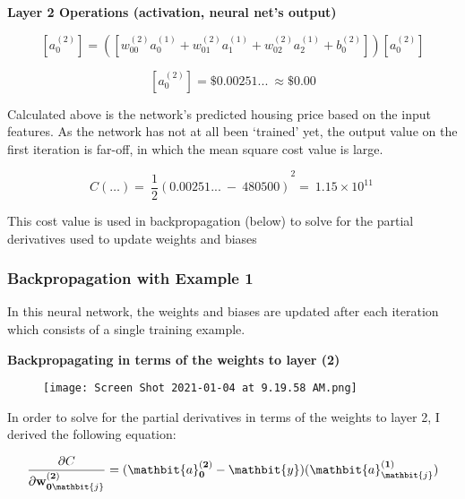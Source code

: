 \documentclass[12pt,a4paper]{article}
\begin{document}
\hspace{}

\textbf{Layer 2 Operations (activation, neural net’s output)}


\begin{equation}
\left[a_0^{\left(2\right)}\right]=\left(\left[w_{00}^{\left(2\right)}a_0^{\left(1\right)}+w_{01}^{\left(2\right)}a_1^{\left(1\right)}+w_{02}^{\left(2\right)}a_2^{\left(1\right)}+b_0^{\left(2\right)}\right]\right)
\left[a_0^{\left(2\right)}\right]
\end{equation}


\begin{equation}
\left[a_0^{\left(2\right)}\right]= \$ 0.00251...\ \approx \$ 0.00
\end{equation}


Calculated above is the network’s predicted housing price based on the input features. As the network has not at all been ‘trained’ yet, the output value on the first iteration is far-off, in which the mean square cost value is large. 

\begin{equation}
C\left(\ldots\right)=\ {\frac{1}{2}\left(0.00251...\ -\ 480500\right)}^2=\ 1.15\times{10}^{11}\ 
\end{equation}
 

This cost value is used in backpropagation (below) to solve for the partial derivatives used to update weights and biases

\subsubsection{Backpropagation with Example 1}

In this neural network, the weights and biases are updated after each iteration which consists of a single training example. 



\hspace{}

\textbf{Backpropagating in terms of the weights to layer (2)} 
\begin{multicols}{2}
\begin{figure}[H]
    \centering
    \texttt{[image: Screen Shot 2021-01-04 at 9.19.58 AM.png]}
    \caption{}
    \label{fig:my_label}
\end{figure} 
\columnbreak
In order to solve for the partial derivatives in terms of the weights to layer 2, I derived the following equation:

\begin{equation}
\frac{\partial C}{\partial\mathbf{w}_{\mathbf{0}\mathbit{j}}^{\left(\mathbf{2}\right)}}={(\mathbit{a}}_\mathbf{0}^{\left(\mathbf{2}\right)}-\mathbit{y})(\mathbit{a}_\mathbit{j}^{\left(\mathbf{1}\right)})
\end{equation}
\end{multicols}
\end{document}
